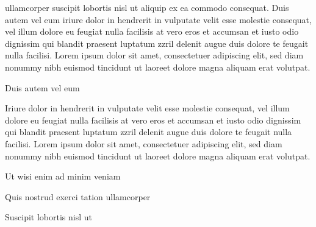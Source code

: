 \documentclass[11pt,twoside]{article}\makeatletter
\begin{document}
      ullamcorper suscipit lobortis nisl ut aliquip ex ea commodo
      consequat. Duis autem vel eum iriure dolor in hendrerit in vulputate
      velit esse molestie consequat, vel illum dolore eu feugiat nulla
      facilisis at vero eros et accumsan et iusto odio dignissim qui blandit
      praesent luptatum zzril delenit augue duis dolore te feugait nulla
      facilisi. Lorem ipsum dolor sit amet, consectetuer adipiscing elit,
      sed diam nonummy nibh euismod tincidunt ut laoreet dolore magna
      aliquam erat volutpat. \par Duis autem vel eum \par Iriure dolor in hendrerit in vulputate velit esse molestie
      consequat, vel illum dolore eu feugiat nulla facilisis at vero eros et
      accumsan et iusto odio dignissim qui blandit praesent luptatum zzril
      delenit augue duis dolore te feugait nulla facilisi. Lorem ipsum dolor
      sit amet, consectetuer adipiscing elit, sed diam nonummy nibh euismod
      tincidunt ut laoreet dolore magna aliquam erat volutpat. \par Ut wisi enim ad minim veniam\par Quis nostrud exerci tation ullamcorper \par Suscipit lobortis nisl ut 
\end{document}
